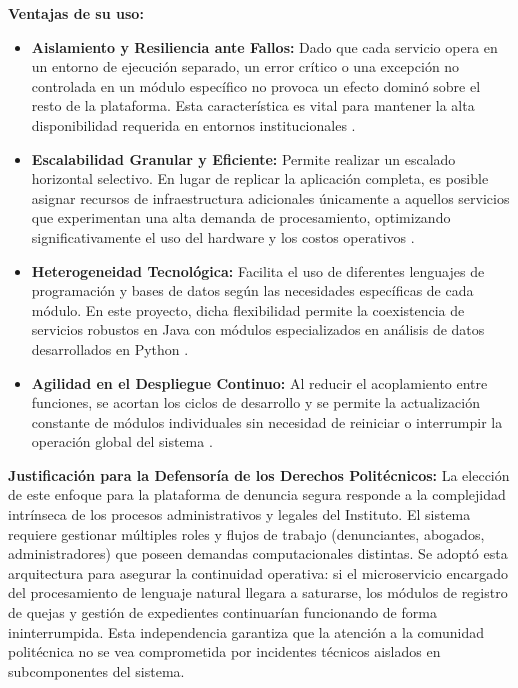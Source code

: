 \textbf{Ventajas de su uso:}
\begin{itemize}
\item \textbf{Aislamiento y Resiliencia ante Fallos:} Dado que cada servicio opera en un entorno de ejecución separado, un error crítico o una excepción no controlada en un módulo específico no provoca un efecto dominó sobre el resto de la plataforma. Esta característica es vital para mantener la alta disponibilidad requerida en entornos institucionales \cite{32} .

\item \textbf{Escalabilidad Granular y Eficiente:} Permite realizar un escalado horizontal selectivo. En lugar de replicar la aplicación completa, es posible asignar recursos de infraestructura adicionales únicamente a aquellos servicios que experimentan una alta demanda de procesamiento, optimizando significativamente el uso del hardware y los costos operativos \cite{32} \cite{29} .

\item \textbf{Heterogeneidad Tecnológica:} Facilita el uso de diferentes lenguajes de programación y bases de datos según las necesidades específicas de cada módulo. En este proyecto, dicha flexibilidad permite la coexistencia de servicios robustos en Java con módulos especializados en análisis de datos desarrollados en Python \cite{32} .

\item \textbf{Agilidad en el Despliegue Continuo:} Al reducir el acoplamiento entre funciones, se acortan los ciclos de desarrollo y se permite la actualización constante de módulos individuales sin necesidad de reiniciar o interrumpir la operación global del sistema \cite{33} .

\end{itemize}

\textbf{Justificación para la Defensoría de los Derechos Politécnicos:}
La elección de este enfoque para la plataforma de denuncia segura responde a la complejidad intrínseca de los procesos administrativos y legales del Instituto. El sistema requiere gestionar múltiples roles y flujos de trabajo (denunciantes, abogados, administradores) que poseen demandas computacionales distintas. Se adoptó esta arquitectura para asegurar la continuidad operativa: si el microservicio encargado del procesamiento de lenguaje natural llegara a saturarse, los módulos de registro de quejas y gestión de expedientes continuarían funcionando de forma ininterrumpida. Esta independencia garantiza que la atención a la comunidad politécnica no se vea comprometida por incidentes técnicos aislados en subcomponentes del sistema.

